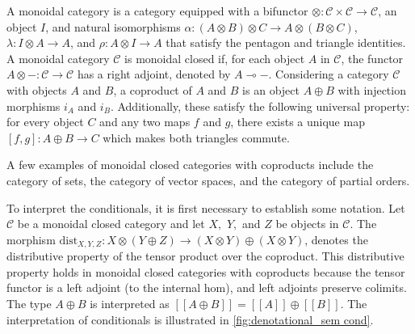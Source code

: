 \documentclass[10pt,a4paper]{amsart}
\theoremstyle{definition}
\theoremstyle{definition}
\theoremstyle{definition}
\theoremstyle{definition}
\theoremstyle{definition}
\theoremstyle{definition}
\begin{document}
A monoidal category is a category equipped with a bifunctor $\otimes: \mathcal{C} \times \mathcal{C} \xrightarrow{} \mathcal{C}$, an object $I$, and natural isomorphisms $\alpha: (A \otimes B) \otimes C \xrightarrow{} A \otimes (B \otimes C)$, $\lambda: I \otimes A \xrightarrow{} A$, and $\rho: A \otimes I \xrightarrow{} A$ that satisfy the pentagon and triangle identities. A monoidal category $\mathcal{C}$ is monoidal closed if, for each object $A$ in $\mathcal{C}$, the functor $A \otimes - : \mathcal{C} \to \mathcal{C}$ has a right adjoint, denoted by $A \multimap -$. %
Considering a category $\mathcal{C}$  with objects $A$ and $B$, a coproduct of $A$ and $B$ is an object $A \oplus B$ with injection morphisms $i_A$ and $i_B$. Additionally, these satisfy the following universal property: for every object $C$ and any two maps $f $ and $g$, there exists a unique map $[f,g] : A \oplus B \rightarrow C$ which makes both triangles commute.


A few examples of monoidal closed categories with coproducts include the category of sets, the category of vector spaces, and the category of partial orders.



To interpret the conditionals, it is first necessary to establish some notation. Let $\mathcal{C}$ be a monoidal closed category and let $X,$ $Y,$ and $Z$ be objects in $\mathcal{C}$. The morphism $\text{dist}_{X, Y,Z}: X \otimes  \left(Y \oplus Z\right) \xrightarrow{} \left(X \otimes Y\right) \oplus \left(X \otimes Y\right)$, denotes the distributive property of the tensor product over the coproduct.  This distributive property holds in monoidal closed categories with coproducts because the tensor functor is a left adjoint (to the internal hom), and left adjoints preserve colimits.
The type $A \oplus B$ is interpreted as $[\![A \oplus B ]\!] = [\![A ]\!] \oplus [\![ B ]\!]$. The interpretation of conditionals is illustrated in \autoref{fig:denotational_sem cond}.
\end{document}
